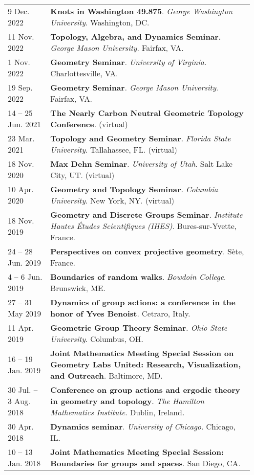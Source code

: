 \begin{center}
{\begin{longtable}{p{}  p{}}
9 Dec.  2022 & \textbf{Knots in Washington 49.875}. \textit{George Washington University}.  Washington, DC.  \\ 
11 Nov.  2022 & \textbf{Topology, Algebra, and Dynamics Seminar}. \textit{George Mason University}.  Fairfax, VA.  \\ 
1 Nov.  2022 & \textbf{Geometry Seminar}. \textit{University of Virginia}.  Charlottesville, VA.  \\ 
19 Sep.  2022 & \textbf{Geometry Seminar}. \textit{George Mason University}.  Fairfax, VA.  \\ 
14  -- 25 Jun.  2021 & \textbf{The Nearly Carbon Neutral Geometric Topology Conference}. (virtual) \\ 
23 Mar.  2021 & \textbf{Topology and Geometry Seminar}. \textit{Florida State University}.  Tallahassee, FL. (virtual) \\ 
18 Nov.  2020 & \textbf{Max Dehn Seminar}. \textit{University of Utah}.  Salt Lake City, UT. (virtual) \\ 
10 Apr.  2020 & \textbf{Geometry and Topology Seminar}. \textit{Columbia University}.  New York, NY. (virtual) \\ 
18 Nov.  2019 & \textbf{Geometry and Discrete Groups Seminar}. \textit{Institute Hautes \'Etudes Scientifiques (IHES)}.  Bures-sur-Yvette, France.  \\ 
24  -- 28 Jun.  2019 & \textbf{Perspectives on convex projective geometry}.  S\`ete, France.  \\ 
4  -- 6 Jun.  2019 & \textbf{Boundaries of random walks}. \textit{Bowdoin College}.  Brunswick, ME.  \\ 
27  -- 31 May  2019 & \textbf{Dynamics of group actions: a conference in the honor of Yves Benoist}.  Cetraro, Italy.  \\ 
11 Apr.  2019 & \textbf{Geometric Group Theory Seminar}. \textit{Ohio State University}.  Columbus, OH.  \\ 
16  -- 19 Jan.  2019 & \textbf{Joint Mathematics Meeting Special Session on Geometry Labs United: Research, Visualization, and Outreach}.  Baltimore, MD.  \\ 
30 Jul.  -- 3 Aug.  2018 & \textbf{Conference on group actions and ergodic theory in geometry and topology}. \textit{The Hamilton Mathematics Institute}.  Dublin, Ireland.  \\ 
30 Apr.  2018 & \textbf{Dynamics seminar}. \textit{University of Chicago}.  Chicago, IL.  \\ 
10  -- 13 Jan.  2018 & \textbf{Joint Mathematics Meeting Special Session: Boundaries for groups and spaces}.  San Diego, CA.  \\ 

\end{longtable}}
\end{center}
